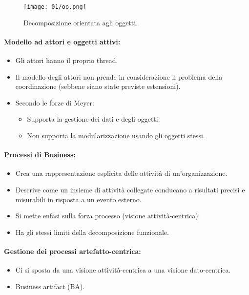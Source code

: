 \begin{figure}[h]
  \centering
  \texttt{[image: 01/oo.png]}
  \caption{Decomposizione orientata agli oggetti.}
\end{figure}

\paragraph{Modello ad attori e oggetti attivi:}

\begin{itemize}
  \item Gli attori hanno il proprio thread. 
  \item Il modello degli attori non prende in considerazione il problema della coordinazione (sebbene siano state previste estensioni). 
  \item Secondo le forze di Meyer: 
    \begin{itemize}
      \item Supporta la gestione dei dati e degli oggetti. 
      \item Non supporta la modularizzazione usando gli oggetti stessi.
    \end{itemize}
\end{itemize}

\paragraph{Processi di Business:}

\begin{itemize}
  \item Crea una rappresentazione esplicita delle attività di un'organizzazione. 
  \item Descrive come un insieme di attività collegate conducano a risultati precisi e misurabili in risposta a un evento esterno. 
  \item Si mette enfasi sulla forza processo (visione attività-centrica). 
  \item Ha gli stessi limiti della decomposizione funzionale.
\end{itemize}

\paragraph{Gestione dei processi artefatto-centrica:}

\begin{itemize}
  \item Ci si sposta da una visione attività-centrica a una visione dato-centrica. 
  \item Business artifact (BA).
\end{itemize}

